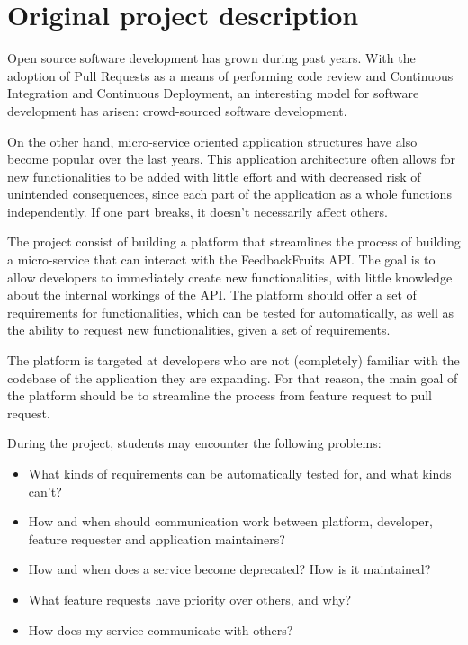 \chapter{Original project description}
Open source software development has grown during past years. With the adoption of Pull Requests as a means of performing code review and Continuous Integration and Continuous Deployment, an interesting model for software development has arisen: crowd-sourced software development.

On the other hand, micro-service oriented application structures have also become popular over the last years. This application architecture often allows for new functionalities to be added with little effort and with decreased risk of unintended consequences, since each part of the application as a whole functions independently. If one part breaks, it doesn't necessarily affect others.

The project consist of building a platform that streamlines the process of building a micro-service that can interact with the FeedbackFruits API. The goal is to allow developers to immediately create new functionalities, with little knowledge about the internal workings of the API. The platform should offer a set of requirements for functionalities, which can be tested for automatically, as well as the ability to request new functionalities, given a set of requirements.

The platform is targeted at developers who are not (completely) familiar with the codebase of the application they are expanding. For that reason, the main goal of the platform should be to streamline the process from feature request to pull request.

During the project, students may encounter the following problems:
\begin{itemize}[nosep]
    \item What kinds of requirements can be automatically tested for, and what kinds can't?
    \item How and when should communication work between platform, developer, feature requester and application maintainers?
    \item How and when does a service become deprecated? How is it maintained?
    \item What feature requests have priority over others, and why?
    \item How does my service communicate with others?
\end{itemize}

